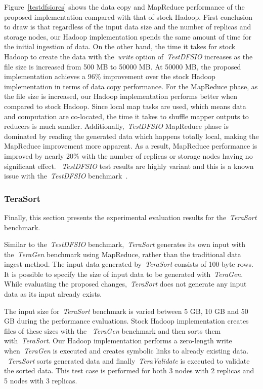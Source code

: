 Figure~\ref{testdfsiores} shows the data copy and MapReduce performance of the proposed implementation
compared with that of stock Hadoop. First conclusion to draw is that regardless of the input data size
and the number of replicas and storage nodes, our Hadoop implementation spends the same amount of time
for the initial ingestion of data. On the other hand, the time it takes for stock Hadoop to create the
data with the~\textit{write} option of~\textit{TestDFSIO} increases as the file size is increased
from 500 MB to 50000 MB. At 50000 MB, the proposed implementation achieves a 96\% improvement over the stock
Hadoop implementation in terms of data copy performance. For the MapReduce phase, as the file size
is increased, our Hadoop implementation performs better when compared to stock Hadoop.
Since local map tasks are used, which means data and computation are co-located, the time it takes
to shuffle mapper outputs to reducers is much smaller. Additionally,~\textit{TestDFSIO}
MapReduce phase is dominated by reading the generated data which happens totally local,
making the MapReduce improvement more apparent. As a result, MapReduce performance is improved
by nearly 20\% with the number of replicas or storage nodes having no significant effect.
~\textit{TestDFSIO} test results are highly variant and this is a known issue with
the~\textit{TestDFSIO} benchmark~\cite{hdfs941}.

\subsubsection{TeraSort}
Finally, this section presents the experimental evaluation results for the~\textit{TeraSort} benchmark.

Similar to the~\textit{TestDFSIO} benchmark,~\textit{TeraSort} generates its own input
with the~\textit{TeraGen} benchmark using MapReduce, rather than the traditional
data ingest method. The input data generated by~\textit{TeraSort} consists of 100-byte rows.
It is possible to specify the size of input data to be generated with~\textit{TeraGen}. While
evaluating the proposed changes,~\textit{TeraSort} does not generate any input data as its input
already exists.

The input size for~\textit{TeraSort} benchmark is varied between 5 GB, 10 GB and 50 GB during
the performance evaluations. Stock Hadoop implementation creates files of these sizes with the
~\textit{TeraGen} benchmark and then sorts them with~\textit{TeraSort}. Our Hadoop implementation performs
a zero-length write when~\textit{TeraGen} is executed and creates symbolic links to already existing data.
~\textit{TeraSort} sorts generated data and finally~\textit{TeraValidate} is executed to validate the
sorted data. This test case is performed for both 3 nodes with 2 replicas and 5 nodes with 3 replicas.

